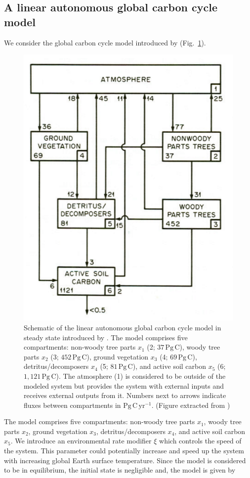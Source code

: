 \documentclass[smallextended]{svjour3}
\newcommand{\peta}{\mathrm{P}}
\newcommand{\gC}{\mathrm{g\,C}}
\newcommand{\yr}{\mathrm{yr}}
\begin{document}
\subsection{A linear autonomous global carbon cycle model}
\label{subsec:example_1}
We consider the global carbon cycle model introduced by \citet{Emanuel1981} (Fig.~\ref{fig:Emanuel_model}).
\begin{figure}%
    \centering
    \includegraphics[width=0.5\linewidth]{figs/Emanuel_model}
    \caption[Schematic of the linear autonomous global carbon cycle model in steady state introduced by \citet{Emanuel1981}.]{Schematic of the linear autonomous global carbon cycle model in steady state introduced by \citet{Emanuel1981}. 
      The model comprises five compartments: non-woody tree parts $x_1$ (2; $37\,\peta\gC$), woody tree parts $x_2$ (3; $452\,\peta\gC$), ground vegetation $x_3$ (4; $69\,\peta\gC$), detritus/decomposers $x_4$ (5; $81\,\peta\gC$), and active soil carbon $x_5$ (6; $1,121\,\peta\gC$). The atmosphere (1) is considered to be outside of the modeled system but provides the system with external inputs and receives external outputs from it. Numbers next to arrows indicate fluxes between compartments in $\peta\gC\,\yr^{-1}$. (Figure extracted from \citealt{Emanuel1981})}\label{fig:Emanuel_model}
\end{figure}
The model comprises five compartments: non-woody tree parts $x_1$, woody tree parts $x_2$, ground vegetation $x_3$, detritus/decomposers $x_4$, and active soil carbon $x_5$.
We introduce an environmental rate modifier $\xi$ which controls the speed of the system.
This parameter could potentially increase and speed up the system with increasing global Earth surface temperature.
Since the model is considered to be in equilibrium, the initial state is negligible and, the model is given by
\end{document}
